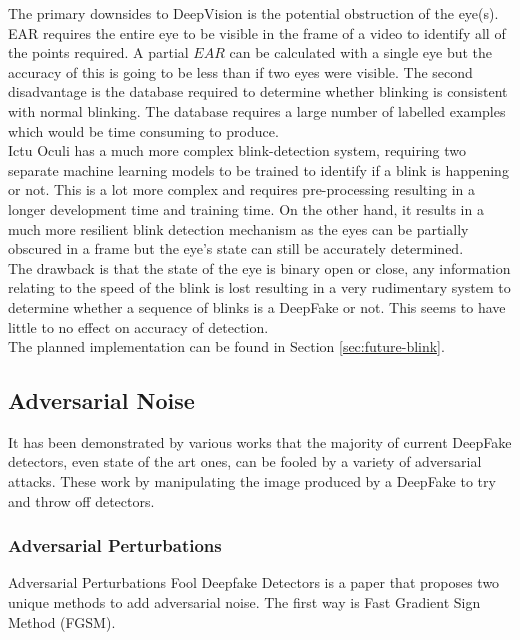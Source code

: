 \documentclass{article}
\begin{document}
The primary downsides to DeepVision is the potential obstruction of the eye(s). EAR requires the entire eye to be visible in the frame of a video to identify all of the points required. A partial $EAR$ can be calculated with a single eye but the accuracy of this is going to be less than if two eyes were visible. The second disadvantage is the database required to determine whether blinking is consistent with normal blinking. The database requires a large number of labelled examples which would be time consuming to produce.\\

Ictu Oculi has a much more complex blink-detection system, requiring two separate machine learning models to be trained to identify if a blink is happening or not. This is a lot more complex and requires pre-processing resulting in a longer development time and training time. On the other hand, it results in a much more resilient blink detection mechanism as the eyes can be partially obscured in a frame but the eye's state can still be accurately determined.\\

The drawback is that the state of the eye is binary open or close, any information relating to the speed of the blink is lost resulting in a very rudimentary system to determine whether a sequence of blinks is a DeepFake or not. This seems to have little to no effect on accuracy of detection.\\

The planned implementation can be found in Section \ref{sec:future-blink}.

\subsection{Adversarial Noise}

It has been demonstrated by various works that the majority of current DeepFake detectors, even state of the art ones, can be fooled by a variety of adversarial attacks\cite{juefei2022countering}. These work by manipulating the image produced by a DeepFake to try and throw off detectors.

\subsubsection{Adversarial Perturbations}

Adversarial Perturbations Fool Deepfake Detectors is a paper that proposes two unique methods to add adversarial noise\cite{pertubations}. The first way is Fast Gradient Sign Method (FGSM).
\end{document}

